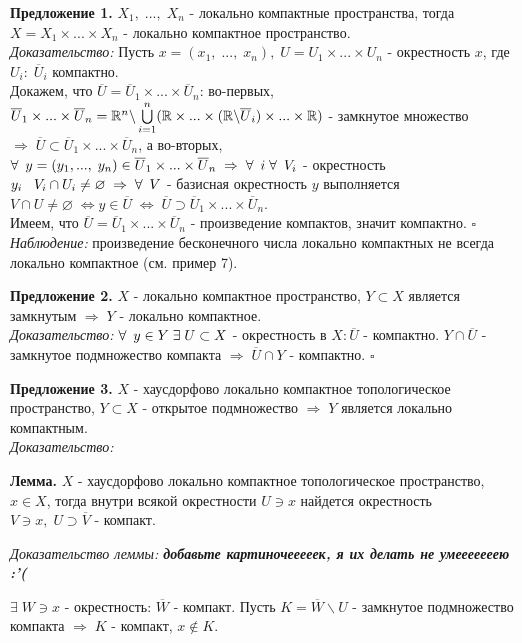 \documentclass[../../main.tex]{subfiles}
\begin{document}
\textbf{Предложение 1.} $X_1,\;...,\; X_n$ - локально компактные пространства, тогда $X = X_1\times...\times X_n$ - локально компактное пространство.\\
\textit{Доказательство:} Пусть $x = (x_1,\;...,\;x_n),\;U = U_1\times...\times U_n$ - окрестность $x$, где $U_i:\; \overline U_i$ компактно.\\
Докажем, что $\overline U = \overline U_1\times...\times\overline U_n$: во-первых, $\overline U_1\times...\times\overline U_n = \mathbb{R}^n \backslash \bigcup \limits_{i=1}^n (\mathbb{R} \times ... \times (\mathbb{R} \backslash \overline U_i)\times...\times\mathbb{R})$ - замкнутое множество $\Rightarrow\; \overline U \subset \overline U_1\times...\times\overline U_n$, а во-вторых, $\forall\:\; y=(y_1,...,\; y_n)\in \overline U_1\times...\times\overline U_n\;\Rightarrow\; \forall\:\;i\;\forall\:\;V_i$ - окрестность $y_i\;\;\;V_i\cap U_i\neq\varnothing\;\Rightarrow\;\forall\:\;V$ - базисная окрестность $y$ выполняется $V\cap U\neq\varnothing\;\Leftrightarrow y\in \overline U\;\Leftrightarrow\; \overline U\supset \overline U_1\times...\times\overline U_n$.\\
Имеем, что $\overline U = \overline U_1\times...\times\overline U_n$ - произведение компактов, значит компактно. $\square$\\
\textit{Наблюдение:} произведение бесконечного числа локально компактных не всегда локально компактное (см. пример 7).

\textbf{Предложение 2.} $X$ - локально компактное пространство, $Y\subset X$ является замкнутым $\Rightarrow\;Y$ - локально компактное.\\
\textit{Доказательство:} $\forall\:\;y\in Y\;\exists\; U\subset X$ - окрестность в $X:\overline U$ - компактно. $Y\cap\overline U$ - замкнутое подмножество компакта $\Rightarrow\; \overline U\cap Y$ - компактно. $\square$

\textbf{Предложение 3.} $X$ - хаусдорфово локально компактное топологическое пространство, $Y\subset X$ - открытое подмножество $\Rightarrow\;Y$ является локально компактным.\\
\textit{Доказательство:}

\textbf{Лемма.} $X$ - хаусдорфово локально компактное топологическое пространство, $x\in X$, тогда внутри всякой окрестности $U\ni x$ найдется окрестность $V\ni x,\; U\supset \overline V$ - компакт.

\textit{Доказательство леммы: \textbf{добавьте картиночееееек, я их делать не умееееееею :'(}}

$\exists\; W\ni x$ - окрестность: $\overline W$ - компакт. Пусть $K = \overline W\backslash U$ - замкнутое подмножество компакта $\Rightarrow\; K$ - компакт, $x\notin K$.
\end{document}
